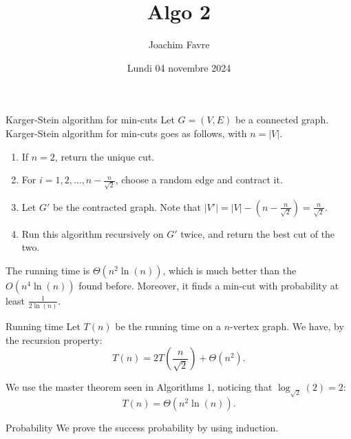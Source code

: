 \documentclass[a4paper]{article}
\title{Algo 2}
\author{Joachim Favre}
\date{Lundi 04 novembre 2024}
\begin{document}
\maketitle


\begin{parag}{Karger-Stein algorithm for min-cuts}
    Let $G = \left(V, E \right)$ be a connected graph. Karger-Stein algorithm for min-cuts goes as follows, with $n = \left|V\right|$.
    \begin{enumerate}
        \item If $n = 2$, return the unique cut.
        \item For $i = 1, 2, \ldots, n - \frac{n}{\sqrt{2}}$, choose a random edge and contract it.
        \item Let $G'$ be the contracted graph. Note that $\left|V'\right| = \left|V\right| - (n - \frac{n}{\sqrt{2}}) = \frac{n}{\sqrt{2}}$.
        \item Run this algorithm recursively on $G'$ twice, and return the best cut of the two.
    \end{enumerate}

    The running time is $\Theta\left(n^2 \ln\left(n\right)\right)$, which is much better than the $O\left(n^4 \ln\left(n\right)\right)$ found before. Moreover, it finds a min-cut with probability at least $\frac{1}{2 \ln\left(n\right)}$.

    \begin{subparag}{Running time}
        Let $T\left(n\right)$ be the running time on a $n$-vertex graph. We have, by the recursion property: 
        \[T\left(n\right) = 2T\left(\frac{n}{\sqrt{2}}\right) + \Theta\left(n^2\right).\]
        
        We use the master theorem seen in Algorithms 1, noticing that $\log_{\sqrt{2}}\left(2\right) = 2$:
        \[T\left(n\right) = \Theta\left(n^2 \ln\left(n\right)\right).\]
    \end{subparag}

    \begin{subparag}{Probability}
        We prove the success probability by using induction.


\end{subparag}
\end{parag}
\end{document}

